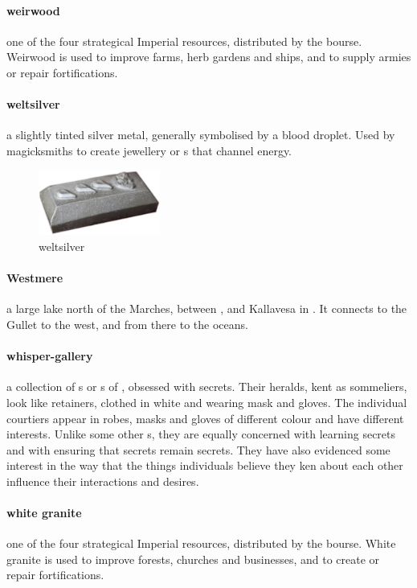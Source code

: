\paragraph{weirwood} one of the four strategical Imperial resources, distributed by the bourse. Weirwood is used to improve farms, herb gardens and ships, and to supply armies or repair fortifications.
\paragraph{weltsilver} a slightly tinted silver metal, generally symbolised by a blood droplet. Used by magicksmiths to create jewellery or s that channel energy.\begin{figure}\centering\includegraphics[width=4cm]{encyclopedia/weltsilver}\caption{weltsilver}\end{figure} 
\paragraph{Westmere} a large lake north of the Marches, between ,  and Kallavesa in . It connects to the Gullet to the west, and from there to the oceans.
\paragraph{whisper-gallery} a collection of s or s of , obsessed with secrets. Their heralds, kent as sommeliers, look like retainers, clothed in white and wearing mask and gloves. The individual courtiers appear in robes, masks and gloves of different colour and have different interests. Unlike some other  s, they are equally concerned with learning secrets and with ensuring that secrets remain secrets. They have also evidenced some interest in the way that the things individuals believe they ken about each other influence their interactions and desires.
\paragraph{white granite} one of the four strategical Imperial resources, distributed by the bourse. White granite is used to improve forests, churches and businesses, and to create or repair fortifications.

